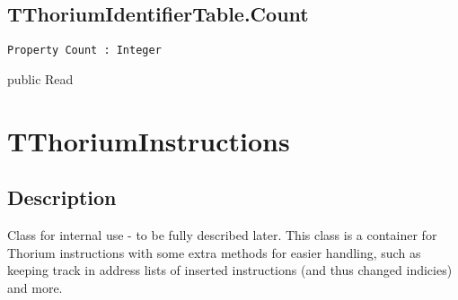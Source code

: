 \subsection{TThoriumIdentifierTable.Count}
\label{thoriumcorepkg:thorium:tthoriumidentifiertable:count}
\begin{FPCList}
\Declaration 

\begin{verbatim}
Property Count : Integer
\end{verbatim}
\Visibility
public
\Access
Read
\end{FPCList}
\section{TThoriumInstructions}
\label{thoriumcorepkg:thorium:tthoriuminstructions}
\subsection{Description}
Class for internal use - to be fully described later.  This class is a container for Thorium instructions with some extra methods for easier handling, such as keeping track in address lists of inserted instructions (and thus changed indicies) and more.%
